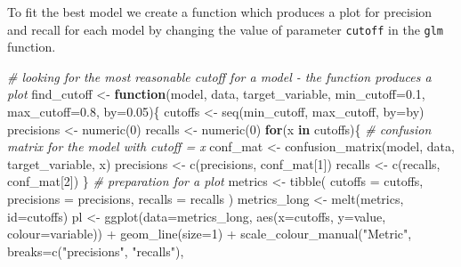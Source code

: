 \documentclass[
]{report}
\newenvironment{Shaded}{\begin{snugshade}}{\end{snugshade}}
\newcommand{\AttributeTok}[1]{\textcolor[rgb]{0.77,0.63,0.00}{#1}}
\newcommand{\CommentTok}[1]{\textcolor[rgb]{0.56,0.35,0.01}{\textit{#1}}}
\newcommand{\ControlFlowTok}[1]{\textcolor[rgb]{0.13,0.29,0.53}{\textbf{#1}}}
\newcommand{\DecValTok}[1]{\textcolor[rgb]{0.00,0.00,0.81}{#1}}
\newcommand{\FloatTok}[1]{\textcolor[rgb]{0.00,0.00,0.81}{#1}}
\newcommand{\FunctionTok}[1]{\textcolor[rgb]{0.00,0.00,0.00}{#1}}
\newcommand{\NormalTok}[1]{#1}
\newcommand{\OtherTok}[1]{\textcolor[rgb]{0.56,0.35,0.01}{#1}}
\newcommand{\SpecialCharTok}[1]{\textcolor[rgb]{0.00,0.00,0.00}{#1}}
\newcommand{\StringTok}[1]{\textcolor[rgb]{0.31,0.60,0.02}{#1}}
\begin{document}
To fit the best model we create a function which produces a plot for
precision and recall for each model by changing the value of parameter
\texttt{cutoff} in the \texttt{glm} function.

\begin{Shaded}
\begin{Highlighting}[]
\CommentTok{\# looking for the most reasonable cutoff for a model {-} the function produces a plot}
\NormalTok{find\_cutoff }\OtherTok{\textless{}{-}} \ControlFlowTok{function}\NormalTok{(model, data, target\_variable, }\AttributeTok{min\_cutoff=}\FloatTok{0.1}\NormalTok{, }\AttributeTok{max\_cutoff=}\FloatTok{0.8}\NormalTok{, }\AttributeTok{by=}\FloatTok{0.05}\NormalTok{)\{}
\NormalTok{  cutoffs }\OtherTok{\textless{}{-}} \FunctionTok{seq}\NormalTok{(min\_cutoff, max\_cutoff, }\AttributeTok{by=}\NormalTok{by)}
\NormalTok{  precisions }\OtherTok{\textless{}{-}} \FunctionTok{numeric}\NormalTok{(}\DecValTok{0}\NormalTok{)}
\NormalTok{  recalls }\OtherTok{\textless{}{-}} \FunctionTok{numeric}\NormalTok{(}\DecValTok{0}\NormalTok{)}
  \ControlFlowTok{for}\NormalTok{(x }\ControlFlowTok{in}\NormalTok{ cutoffs)\{}
    \CommentTok{\# confusion matrix for the model with cutoff = x}
\NormalTok{    conf\_mat }\OtherTok{\textless{}{-}} \FunctionTok{confusion\_matrix}\NormalTok{(model, data, target\_variable, x) }
\NormalTok{    precisions }\OtherTok{\textless{}{-}} \FunctionTok{c}\NormalTok{(precisions, conf\_mat[}\DecValTok{1}\NormalTok{])}
\NormalTok{    recalls }\OtherTok{\textless{}{-}} \FunctionTok{c}\NormalTok{(recalls, conf\_mat[}\DecValTok{2}\NormalTok{])}
\NormalTok{  \}}
  \CommentTok{\# preparation for a plot}
\NormalTok{  metrics }\OtherTok{\textless{}{-}} \FunctionTok{tibble}\NormalTok{(}
    \AttributeTok{cutoffs =}\NormalTok{ cutoffs,}
    \AttributeTok{precisions =}\NormalTok{ precisions,}
    \AttributeTok{recalls =}\NormalTok{ recalls}
\NormalTok{  )}
\NormalTok{  metrics\_long }\OtherTok{\textless{}{-}} \FunctionTok{melt}\NormalTok{(metrics, }\AttributeTok{id=}\StringTok{\textquotesingle{}cutoffs\textquotesingle{}}\NormalTok{)}
\NormalTok{  pl }\OtherTok{\textless{}{-}} \FunctionTok{ggplot}\NormalTok{(}\AttributeTok{data=}\NormalTok{metrics\_long, }\FunctionTok{aes}\NormalTok{(}\AttributeTok{x=}\NormalTok{cutoffs, }\AttributeTok{y=}\NormalTok{value, }\AttributeTok{colour=}\NormalTok{variable)) }\SpecialCharTok{+} 
    \FunctionTok{geom\_line}\NormalTok{(}\AttributeTok{size=}\DecValTok{1}\NormalTok{) }\SpecialCharTok{+}
    \FunctionTok{scale\_colour\_manual}\NormalTok{(}\StringTok{"Metric"}\NormalTok{, }
                        \AttributeTok{breaks=}\FunctionTok{c}\NormalTok{(}\StringTok{"precisions"}\NormalTok{, }\StringTok{"recalls"}\NormalTok{),}

\end{Highlighting}
\end{Shaded}
\end{document}
